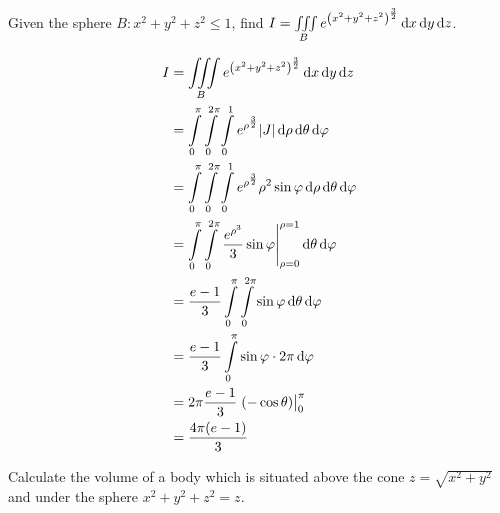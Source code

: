\documentclass[fleqn, a4paper, 12pt, twoside]{article}
\theoremstyle{definition}
\theoremstyle{theorem}
\begin{document}
{\begin{question}
	Given the sphere $B : x^2 + y^2 + z^2 \le 1$, find $I = \iiint\limits_{B} e^{\left( x^2 + y^2 + z^2 \right)^{\frac{3}{2}}} \dif x \dif y \dif z$.
\end{question}

\begin{solution}
	\begin{align*}
		I & = \iiint\limits_{B} e^{\left( x^2 + y^2 + z^2 \right)^{\frac{3}{2}}} \dif x \dif y \dif z                                                         \\
                  & = \int\limits_{0}^{\pi} \int\limits_{0}^{2 \pi} \int\limits_{0}^{1} e^{\rho^{\frac{3}{2}}} |J| \dif \rho \dif \theta \dif \varphi                 \\
                  & = \int\limits_{0}^{\pi} \int\limits_{0}^{2 \pi} \int\limits_{0}^{1} e^{\rho^{\frac{3}{2}}} \rho^2 \sin \varphi \dif \rho \dif \theta \dif \varphi \\
                  & = \int\limits_{0}^{\pi} \int\limits_{0}^{2 \pi} \left. \frac{e^{\rho^3}}{3} \sin \varphi \right|_{\rho = 0}^{\rho = 1} \dif \theta \dif \varphi   \\
                  & = \frac{e - 1}{3} \int\limits_{0}^{\pi} \int\limits_{0}^{2 \pi} \sin \varphi \dif \theta \dif \varphi                                             \\
                  & = \frac{e - 1}{3} \int\limits_{0}^{\pi} \sin \varphi \cdot 2 \pi \dif \varphi                                                                     \\
                  & = 2 \pi \frac{e - 1}{3} \left. (- \cos \theta) \right|_{0}^{\pi}                                                                                  \\
                  & = \frac{4 \pi (e - 1)}{3}
	\end{align*}
\end{solution}

\begin{question}
	Calculate the volume of a body which is situated above the cone $z = \sqrt{x^2 + y^2}$ and under the sphere $x^2 + y^2 + z^2 = z$.
\end{question}

}
\end{document}
